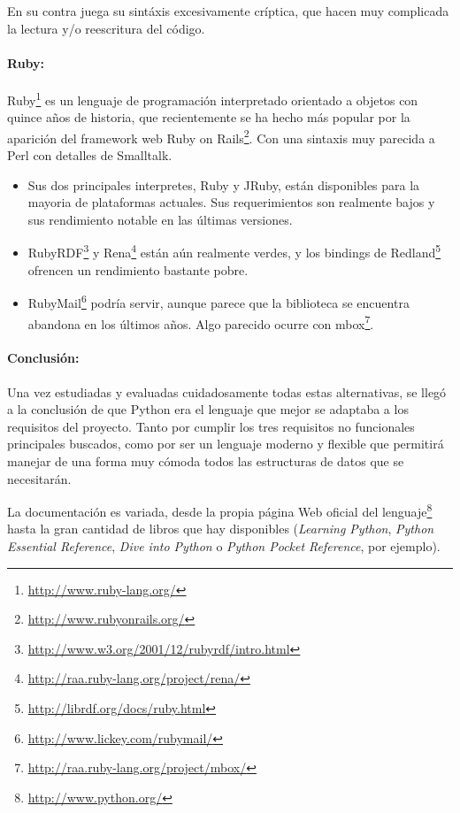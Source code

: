 En su contra juega su sintáxis excesivamente críptica, que hacen muy complicada
la lectura y/o reescritura del código.

\paragraph{Ruby:}Ruby\footnote{\url{http://www.ruby-lang.org/}} es un lenguaje de 
programación interpretado orientado a objetos con quince años de historia, que 
recientemente se ha hecho más popular por la aparición del framework web 
Ruby on Rails\footnote{\url{http://www.rubyonrails.org/}}. Con una sintaxis muy
parecida a Perl con detalles de Smalltalk.

\begin{itemize}
  \item Sus dos principales interpretes, Ruby y JRuby, están disponibles para la
	mayoria de plataformas actuales. Sus requerimientos son realmente bajos y
	sus rendimiento notable en las últimas versiones.
  \item RubyRDF\footnote{\url{http://www.w3.org/2001/12/rubyrdf/intro.html}} y 
	Rena\footnote{\url{http://raa.ruby-lang.org/project/rena/}} están aún
	realmente verdes, y los bindings de Redland\footnote{\url{http://librdf.org/docs/ruby.html}} 
	ofrencen un rendimiento bastante pobre.
  \item RubyMail\footnote{\url{http://www.lickey.com/rubymail/}} podría servir,
	aunque parece que la biblioteca se encuentra abandona en los últimos años. 
	Algo parecido ocurre con mbox\footnote{\url{http://raa.ruby-lang.org/project/mbox/}}.
\end{itemize}

\newpage

\paragraph{Conclusión:}Una vez estudiadas y evaluadas cuidadosamente todas estas 
alternativas, se llegó a la conclusión de que Python era el lenguaje que mejor se 
adaptaba a los requisitos del proyecto. Tanto por cumplir los tres requisitos 
no funcionales principales buscados, como por ser un lenguaje moderno y flexible 
que permitirá manejar de una forma muy cómoda todos las estructuras de datos que se
necesitarán.

La documentación es variada, desde la propia página Web oficial del 
lenguaje\footnote{\url{http://www.python.org/}} hasta la gran cantidad de libros
que hay disponibles (\emph{Learning Python}\cite{LearningPython},
\emph{Python Essential Reference}\cite{PythonEssential}, 
\emph{Dive into Python}\cite{DivePython} o \emph{Python Pocket Reference}\cite{PythonPocket},
por ejemplo).
